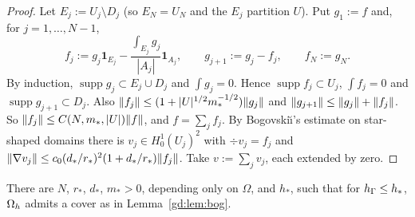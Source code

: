 \begin{proof}
Let $E_j:=U_j\setminus D_j$ (so $E_N=U_N$ and the $E_j$ partition $U$). Put $g_1:=f$ and, for $j=1,\dots,N-1$,
\[
f_j:=g_j\mathbf 1_{E_j}-\frac{\int_{E_j}g_j}{|A_j|}\mathbf 1_{A_j},\qquad g_{j+1}:=g_j-f_j,\qquad f_N:=g_N .
\]
By induction, $\operatorname{supp}g_j\subset E_j\cup D_j$ and $\int g_j=0$. Hence $\operatorname{supp}f_j\subset U_j$, $\int f_j=0$ and $\operatorname{supp}g_{j+1}\subset D_j$. Also $\lVert f_j\rVert\le(1+|U|^{1/2}m_\ast^{-1/2})\lVert g_j\rVert$ and $\lVert g_{j+1}\rVert\le\lVert g_j\rVert+\lVert f_j\rVert$. So $\lVert f_j\rVert\le C(N,m_\ast,|U|)\lVert f\rVert$, and $f=\sum_jf_j$. %
By Bogovski\u{\i}'s estimate on star-shaped domains \cite[Lemma~III.3.1]{Galdi} there is $v_j\in H^1_0(U_j)^2$ with $\div v_j=f_j$ and $\lVert \nabla v_j\rVert\le c_0(d_\ast/r_\ast)^2(1+d_\ast/r_\ast)\lVert f_j\rVert$. Take $v:=\sum_jv_j$, each extended by zero.
\end{proof}

\begin{lemma}\label{gd:lem:cover}
There are $N$, $r_\ast$, $d_\ast$, $m_\ast>0$, depending only on $\Omega$, and $h_\ast$, such that for $h_\Gamma\le h_\ast$, $\Omega_h$ admits a cover as in Lemma~\ref{gd:lem:bog}.
\end{lemma}

